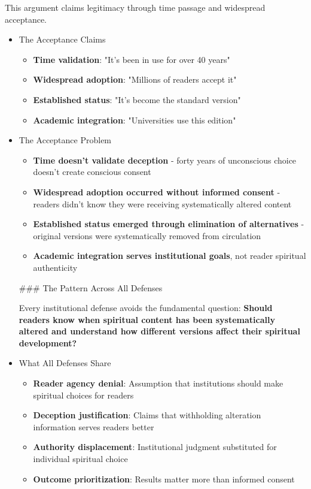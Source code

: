 \documentclass[11pt,twoside]{book}
\begin{document}
This argument claims legitimacy through time passage and widespread acceptance.
\begin{itemize}
\item The Acceptance Claims
\label{sec:org47f4d1e}
\begin{itemize}
\item \textbf{\textbf{Time validation}}: "It's been in use for over 40 years"
\item \textbf{\textbf{Widespread adoption}}: "Millions of readers accept it"
\item \textbf{\textbf{Established status}}: "It's become the standard version"
\item \textbf{\textbf{Academic integration}}: "Universities use this edition"
\end{itemize}
\item The Acceptance Problem
\label{sec:orge9030fa}
\begin{itemize}
\item \textbf{\textbf{Time doesn't validate deception}} - forty years of unconscious choice doesn't create conscious consent
\item \textbf{\textbf{Widespread adoption occurred without informed consent}} - readers didn't know they were receiving systematically altered content
\item \textbf{\textbf{Established status emerged through elimination of alternatives}} - original versions were systematically removed from circulation
\item \textbf{\textbf{Academic integration serves institutional goals}}, not reader spiritual authenticity
\end{itemize}

\#\#\# The Pattern Across All Defenses

Every institutional defense avoids the fundamental question: \textbf{\textbf{\textbf{Should readers know when spiritual content has been systematically altered and understand how different versions affect their spiritual development?}}}
\item What All Defenses Share
\label{sec:org48b9bfb}
\begin{itemize}
\item \textbf{\textbf{Reader agency denial}}: Assumption that institutions should make spiritual choices for readers
\item \textbf{\textbf{Deception justification}}: Claims that withholding alteration information serves readers better
\item \textbf{\textbf{Authority displacement}}: Institutional judgment substituted for individual spiritual choice
\item \textbf{\textbf{Outcome prioritization}}: Results matter more than informed consent
\end{itemize}
\end{itemize}
\end{document}

